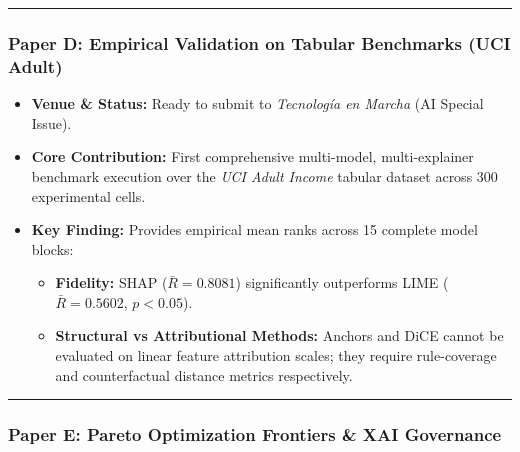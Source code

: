 \documentclass[
]{article}
\providecommand{\tightlist}{%
  \setlength{\itemsep}{0pt}\setlength{\parskip}{0pt}}
\begin{document}
\begin{center}\rule{0.5\linewidth}{0.5pt}\end{center}

\subsubsection{Paper D: Empirical Validation on Tabular Benchmarks (UCI
Adult)}\label{paper-d-empirical-validation-on-tabular-benchmarks-uci-adult}

\begin{itemize}
\tightlist
\item
  \textbf{Venue \& Status:} Ready to submit to \emph{Tecnología en
  Marcha} (AI Special Issue).
\item
  \textbf{Core Contribution:} First comprehensive multi-model,
  multi-explainer benchmark execution over the \emph{UCI Adult Income}
  tabular dataset across 300 experimental cells.
\item
  \textbf{Key Finding:} Provides empirical mean ranks across 15 complete
  model blocks:

  \begin{itemize}
  \tightlist
  \item
    \textbf{Fidelity:} SHAP (\(\bar{R}=0.8081\)) significantly
    outperforms LIME (\(\bar{R}=0.5602\), \(p < 0.05\)).
  \item
    \textbf{Structural vs Attributional Methods:} Anchors and DiCE
    cannot be evaluated on linear feature attribution scales; they
    require rule-coverage and counterfactual distance metrics
    respectively.
  \end{itemize}
\end{itemize}

\begin{center}\rule{0.5\linewidth}{0.5pt}\end{center}

\subsubsection{Paper E: Pareto Optimization Frontiers \& XAI
Governance}\label{paper-e-pareto-optimization-frontiers-xai-governance}
\end{document}

